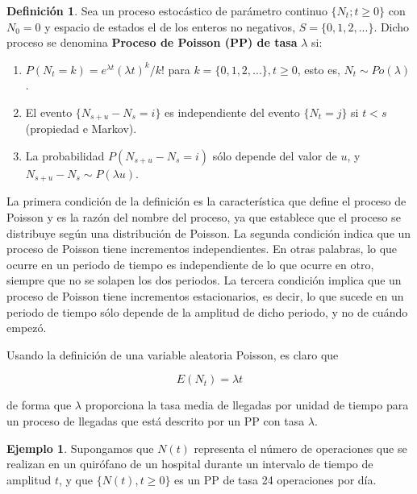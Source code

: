 \documentclass[
]{book}
\providecommand{\tightlist}{%
  \setlength{\itemsep}{0pt}\setlength{\parskip}{0pt}}
\newenvironment{yellowbox}{
  \definecolor{shadecolor}{rgb}{210, 180, 140}  
  \color{black}
  \begin{shaded}}
 {\end{shaded}}
\theoremstyle{definition}
\newtheorem{definition}{Definición}[chapter]
\theoremstyle{definition}
\newtheorem{example}{Ejemplo}[chapter]
\theoremstyle{definition}
\theoremstyle{definition}
\theoremstyle{remark}
\begin{document}
\begin{yellowbox}

\begin{definition}

Sea un proceso estocástico de parámetro continuo \(\{N_t; t \geq 0\}\) con \(N_0 = 0\) y espacio de estados el de los enteros no negativos, \(S=\{0,1,2,...\}\). Dicho proceso se denomina \textbf{Proceso de Poisson (PP) de tasa} \(\lambda\) si:

\begin{enumerate}
\def\labelenumi{\arabic{enumi}.}
\tightlist
\item
  \(P(N_t = k) = e^{\lambda t}(\lambda t)^k/k!\) para \(k=\{0,1,2,...\}, t \geq 0\), esto es, \(N_t \sim Po(\lambda)\).
\item
  El evento \(\{N_{s+u} - N_s = i\}\) es independiente del evento \(\{N_t = j\}\) si \(t<s\) (propiedad e Markov).
\item
  La probabilidad \(P(N_{s+u} - N_s = i)\) sólo depende del valor de \(u\), y \(N_{s+u} - N_s \sim P(\lambda u)\).
\end{enumerate}

\end{definition}

\end{yellowbox}

La primera condición de la definición es la característica que define el proceso de Poisson y es la razón del nombre del proceso, ya que establece que el proceso se distribuye según una distribución de Poisson. La segunda condición indica que un proceso de Poisson tiene incrementos independientes. En otras palabras, lo que ocurre en un periodo de tiempo es independiente de lo que ocurre en otro, siempre que no se solapen los dos periodos. La tercera condición implica que un proceso de Poisson tiene incrementos estacionarios, es decir, lo que sucede en un periodo de tiempo sólo depende de la amplitud de dicho periodo, y no de cuándo empezó.

Usando la definición de una variable aleatoria Poisson, es claro que

\[E(N_t) = \lambda t\]

de forma que \(\lambda\) proporciona la tasa media de llegadas por unidad de tiempo para un proceso de llegadas que está descrito por un PP con tasa \(\lambda\).

\begin{example}
\protect\hypertarget{exm:pp000}{}\label{exm:pp000}Supongamos que \(N(t)\) representa el número de operaciones que se realizan en un quirófano de un hospital durante un intervalo de tiempo de amplitud \(t\), y que \(\{N(t), t\geq0\}\) es un PP de tasa 24 operaciones por día.
\end{example}
\end{document}
